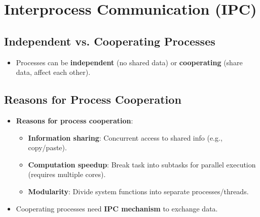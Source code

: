 \section{Interprocess Communication (IPC)}\label{sec:3.4}

\subsection{Independent vs. Cooperating Processes}
\begin{itemize}
    \item Processes can be \textbf{independent} (no shared data) or \textbf{cooperating} (share data, affect each other).
\end{itemize}

\subsection{Reasons for Process Cooperation}
\begin{itemize}
    \item \textbf{Reasons for process cooperation}:
        \begin{itemize}
            \item \textbf{Information sharing}: Concurrent access to shared info (e.g., copy/paste).
            \item \textbf{Computation speedup}: Break task into subtasks for parallel execution (requires multiple cores).
            \item \textbf{Modularity}: Divide system functions into separate processes/threads.
        \end{itemize}
    \item Cooperating processes need \textbf{IPC mechanism} to exchange data.
\end{itemize}

